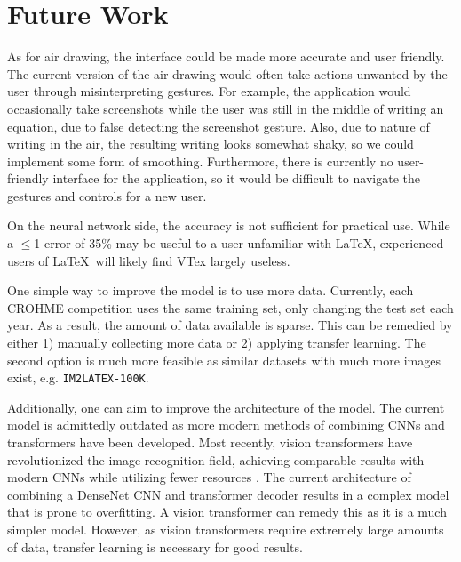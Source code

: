 \section{Future Work}
\label{sec:futurework}

As for air drawing, the interface could be made more accurate and user friendly. The current version of the air drawing would often take actions unwanted by the user through misinterpreting gestures. For example, the application would occasionally take screenshots while the user was still in the middle of writing an equation, due to false detecting the screenshot gesture. Also, due to nature of writing in the air, the resulting writing looks somewhat shaky, so we could implement some form of smoothing. Furthermore, there is currently no user-friendly interface for the application, so it would be difficult to navigate the gestures and controls for a new user.

On the neural network side, the accuracy is not sufficient for practical use. While a $\leq$1 error of 35\% may be useful to a user unfamiliar with \LaTeX, experienced users of \LaTeX\ will likely find VTex largely useless.

One simple way to improve the model is to use more data. Currently, each CROHME competition uses the same training set, only changing the test set each year. As a result, the amount of data available is sparse. This can be remedied by either 1) manually collecting more data or 2) applying transfer learning. The second option is much more feasible as similar datasets with much more images exist, e.g. {\tt IM2LATEX-100K}. 

Additionally, one can aim to improve the architecture of the model. The current model is admittedly outdated as more modern methods of combining CNNs and transformers have been developed. Most recently, vision transformers have revolutionized the image recognition field, achieving comparable results with modern CNNs while utilizing fewer resources \cite{VTransformer}. The current architecture of combining a DenseNet CNN and transformer decoder results in a complex model that is prone to overfitting. A vision transformer can remedy this as it is a much simpler model. However, as vision transformers require extremely large amounts of data, transfer learning is necessary for good results.